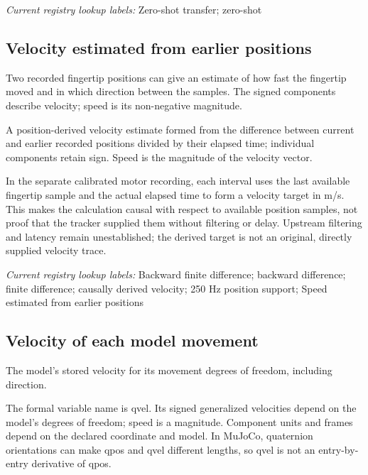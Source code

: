 \noindent\textit{Current registry lookup labels:} Zero-shot transfer; zero-shot\par

\begin{samepage}
\subsection*{Velocity estimated from earlier positions}
\noindent Two recorded fingertip positions can give an estimate of how fast the fingertip moved and in which direction between the samples. The signed components describe velocity; speed is its non-negative magnitude.\par
\end{samepage}
\noindent A position-derived velocity estimate formed from the difference between current and earlier recorded positions divided by their elapsed time; individual components retain sign. Speed is the magnitude of the velocity vector.\par
\begin{samepage}
\noindent In the separate calibrated motor recording, each interval uses the last available fingertip sample and the actual elapsed time to form a velocity target in m/s. This makes the calculation causal with respect to available position samples, not proof that the tracker supplied them without filtering or delay. Upstream filtering and latency remain unestablished; the derived target is not an original, directly supplied velocity trace.\par\nopagebreak[4]

\end{samepage}


\noindent\textit{Current registry lookup labels:} Backward finite difference; backward difference; finite difference; causally derived velocity; 250 Hz position support; Speed estimated from earlier positions\par

\begin{samepage}
\subsection*{Velocity of each model movement}
\noindent The model’s stored velocity for its movement degrees of freedom, including direction.\par
\end{samepage}
\begin{samepage}
\noindent The formal variable name is qvel. Its signed generalized velocities depend on the model’s degrees of freedom; speed is a magnitude. Component units and frames depend on the declared coordinate and model. In MuJoCo, quaternion orientations can make qpos and qvel different lengths, so qvel is not an entry-by-entry derivative of qpos.\par\nopagebreak[4]

\end{samepage}


